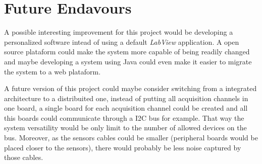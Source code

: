 	\section{Future Endavours}\label{sec:future-endavours}
		A possible interesting improvement for this project would be developing a personalized software intead of using a default \textit{LabView} application. A open source plataform could make the system more capable of being readily changed and maybe developing a system using Java could even make it easier to migrate the system to a web plataform.
		\par
		A future version of this project could maybe consider switching from a integrated architecture to a distribuited one, instead of putting all acquisition channels in one board, a single board for each acquisition channel could be created and all this boards could communicate through a I2C bus for example. That way the system versatility would be only limit to the number of allowed devices on the bus. Moreover, as the sensors cables could be smaller (peripheral boards would be placed closer to the sensors), there would probably be less noise captured by those cables.

